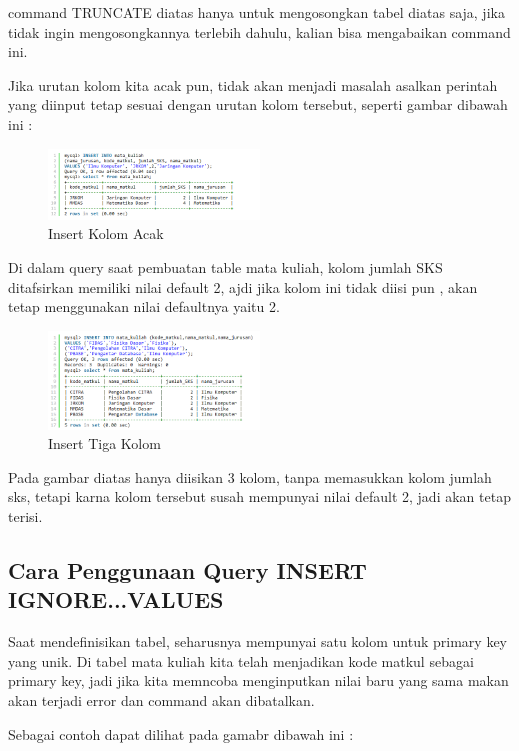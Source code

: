 	command TRUNCATE diatas hanya untuk mengosongkan tabel diatas saja, jika tidak ingin mengosongkannya terlebih dahulu, kalian bisa mengabaikan command ini.
	
	Jika urutan kolom kita acak pun, tidak akan menjadi masalah asalkan perintah yang diinput tetap sesuai dengan urutan kolom tersebut, seperti gambar dibawah ini :
	
		\begin{figure}[ht]
			\centerline{\includegraphics[width=0.5\textwidth]{figures/insert4.png}}
			\caption{Insert Kolom Acak}
			\label{insert4}
			\end{figure}
	
	Di dalam query saat pembuatan table mata kuliah, kolom jumlah SKS ditafsirkan memiliki nilai default 2, ajdi jika kolom ini tidak diisi pun , akan tetap menggunakan nilai defaultnya yaitu 2.
	
		\begin{figure}[ht]
			\centerline{\includegraphics[width=0.5\textwidth]{figures/insert5.png}}
			\caption{Insert Tiga Kolom}
			\label{insert5}
			\end{figure}
			
	Pada gambar diatas hanya diisikan 3 kolom, tanpa memasukkan kolom jumlah sks, tetapi karna kolom tersebut susah mempunyai nilai default 2, jadi akan tetap terisi.
	
	\subsection{Cara Penggunaan Query INSERT IGNORE...VALUES}
	Saat mendefinisikan tabel, seharusnya mempunyai satu kolom untuk primary key yang unik. Di tabel mata kuliah kita telah menjadikan kode matkul sebagai primary key, jadi jika kita memncoba menginputkan nilai baru yang sama makan akan terjadi error dan command akan dibatalkan.
	
	Sebagai contoh dapat dilihat pada gamabr dibawah ini :
	
